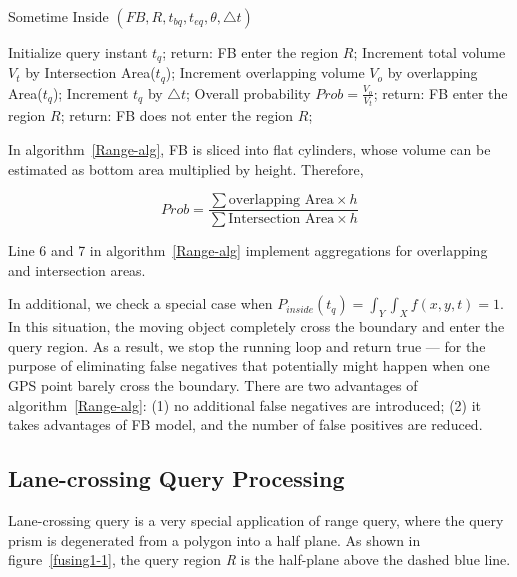\begin{algorithm}
  \caption{Sometime Inside $(FB, R, t_{bq}, t_{eq}, \theta, \triangle t)$}
  \label{Range-alg}
  \begin{algorithmic}[1]
      \State Initialize query instant $t_q$;
      		\State return: FB enter the region $R$;
      	\Else
      		\State Increment total volume $V_t$ by Intersection Area($t_q$);
      		\State Increment overlapping volume $V_o$ by overlapping Area($t_q$);
      	\EndIf
      \State Increment $t_q$ by $\triangle t$;
      \EndWhile
      \State Overall probability $Prob = \frac{V_o}{V_t}$;
      	\State return: FB enter the region $R$;
      \Else
      	\State return: FB does not enter the region $R$;
      \EndIf
  \end{algorithmic}
\end{algorithm}

In algorithm~\ref{Range-alg}, FB is sliced into flat cylinders, whose volume can be estimated as bottom area multiplied
by height. Therefore, 

$$Prob=\frac{\sum \mbox{overlapping Area} \times h}{\sum \mbox{Intersection Area} \times h}$$

Line 6 and 7 in algorithm~\ref{Range-alg} implement aggregations for overlapping and intersection areas.

In additional, we check a special case when $P_{inside}(t_q)=\int_{Y}\int_{X} f(x,y,t)=1$. In this
situation, the moving object completely cross the boundary and enter the query region.
As a result, we stop the running loop and return true --- for the purpose of eliminating false negatives
that potentially might happen when
one GPS point barely cross the boundary. There are two advantages of algorithm~\ref{Range-alg}: (1) no additional
false negatives are introduced; (2) it takes advantages of FB model, and the number of false positives are reduced.


\subsection{Lane-crossing Query Processing}
Lane-crossing query is a very special application of range query, where the query prism is degenerated from
a polygon into a half plane. As shown in figure~\ref{fusing1-1}, the query region \textit{R} is the half-plane
above the dashed blue line.

